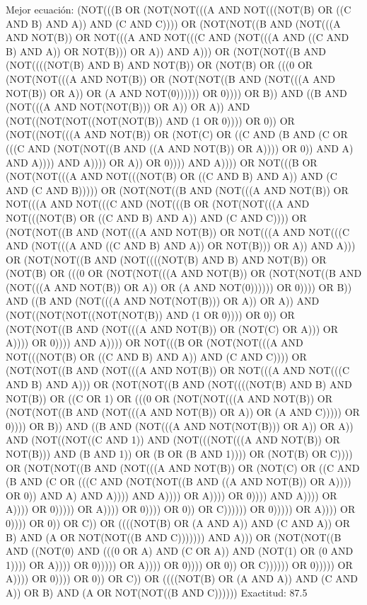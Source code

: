Mejor ecuación: (NOT(((B OR (NOT(NOT(((A AND NOT(((NOT(B) OR ((C AND B) AND A)) AND (C AND C)))) OR (NOT(NOT((B AND (NOT(((A AND NOT(B)) OR NOT(((A AND NOT(((C AND (NOT(((A AND ((C AND B) AND A)) OR NOT(B))) OR A)) AND A))) OR (NOT(NOT((B AND (NOT((((NOT(B) AND B) AND NOT(B)) OR (NOT(B) OR (((0 OR (NOT(NOT(((A AND NOT(B)) OR (NOT(NOT((B AND (NOT(((A AND NOT(B)) OR A)) OR (A AND NOT(0)))))) OR 0)))) OR B)) AND ((B AND (NOT(((A AND NOT(NOT(B))) OR A)) OR A)) AND (NOT((NOT(NOT((NOT(NOT(B)) AND (1 OR 0)))) OR 0)) OR (NOT((NOT(((A AND NOT(B)) OR (NOT(C) OR ((C AND (B AND (C OR (((C AND (NOT(NOT((B AND ((A AND NOT(B)) OR A)))) OR 0)) AND A) AND A)))) AND A)))) OR A)) OR 0)))) AND A)))) OR NOT(((B OR (NOT(NOT(((A AND NOT(((NOT(B) OR ((C AND B) AND A)) AND (C AND (C AND B))))) OR (NOT(NOT((B AND (NOT(((A AND NOT(B)) OR NOT(((A AND NOT(((C AND (NOT(((B OR (NOT(NOT(((A AND NOT(((NOT(B) OR ((C AND B) AND A)) AND (C AND C)))) OR (NOT(NOT((B AND (NOT(((A AND NOT(B)) OR NOT(((A AND NOT(((C AND (NOT(((A AND ((C AND B) AND A)) OR NOT(B))) OR A)) AND A))) OR (NOT(NOT((B AND (NOT((((NOT(B) AND B) AND NOT(B)) OR (NOT(B) OR (((0 OR (NOT(NOT(((A AND NOT(B)) OR (NOT(NOT((B AND (NOT(((A AND NOT(B)) OR A)) OR (A AND NOT(0)))))) OR 0)))) OR B)) AND ((B AND (NOT(((A AND NOT(NOT(B))) OR A)) OR A)) AND (NOT((NOT(NOT((NOT(NOT(B)) AND (1 OR 0)))) OR 0)) OR (NOT(NOT((B AND (NOT(((A AND NOT(B)) OR (NOT(C) OR A))) OR A)))) OR 0)))) AND A)))) OR NOT(((B OR (NOT(NOT(((A AND NOT(((NOT(B) OR ((C AND B) AND A)) AND (C AND C)))) OR (NOT(NOT((B AND (NOT(((A AND NOT(B)) OR NOT(((A AND NOT(((C AND B) AND A))) OR (NOT(NOT((B AND (NOT((((NOT(B) AND B) AND NOT(B)) OR ((C OR 1) OR (((0 OR (NOT(NOT(((A AND NOT(B)) OR (NOT(NOT((B AND (NOT(((A AND NOT(B)) OR A)) OR (A AND C))))) OR 0)))) OR B)) AND ((B AND (NOT(((A AND NOT(NOT(B))) OR A)) OR A)) AND (NOT((NOT((C AND 1)) AND (NOT(((NOT(((A AND NOT(B)) OR NOT(B))) AND (B AND 1)) OR (B OR (B AND 1)))) OR (NOT(B) OR C)))) OR (NOT(NOT((B AND (NOT(((A AND NOT(B)) OR (NOT(C) OR ((C AND (B AND (C OR (((C AND (NOT(NOT((B AND ((A AND NOT(B)) OR A)))) OR 0)) AND A) AND A)))) AND A)))) OR A)))) OR 0)))) AND A)))) OR A)))) OR 0))))) OR A)))) OR 0)))) OR 0)) OR C)))))) OR 0))))) OR A)))) OR 0)))) OR 0)) OR C)) OR ((((NOT(B) OR (A AND A)) AND (C AND A)) OR B) AND (A OR NOT(NOT((B AND C))))))) AND A))) OR (NOT(NOT((B AND ((NOT(0) AND (((0 OR A) AND (C OR A)) AND (NOT(1) OR (0 AND 1)))) OR A)))) OR 0))))) OR A)))) OR 0)))) OR 0)) OR C)))))) OR 0))))) OR A)))) OR 0)))) OR 0)) OR C)) OR ((((NOT(B) OR (A AND A)) AND (C AND A)) OR B) AND (A OR NOT(NOT((B AND C))))))
 Exactitud: 87.5%

